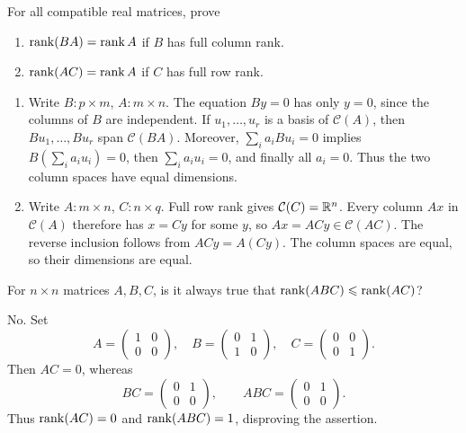 \begin{problem}\label{ex:04:full-rank-products}
For all compatible real matrices, prove
\begin{enumerate}
\item \(\operatorname{rank}(BA)=\operatorname{rank} A\) if \(B\) has full column rank.
\item \(\operatorname{rank}(AC)=\operatorname{rank} A\) if \(C\) has full row rank.
\end{enumerate}
\end{problem}
\begin{solution}
\begin{enumerate}
\item Write \(B:p\times m\), \(A:m\times n\).
The equation \(By=0\) has only \(y=0\), since the columns of \(B\) are independent.
If \(u_1,\ldots,u_r\) is a basis of \(\mathcal C(A)\), then
\(Bu_1,\ldots,Bu_r\) span \(\mathcal C(BA)\).
Moreover, \(\sum_i a_iBu_i=0\) implies \(B(\sum_i a_iu_i)=0\),
then \(\sum_i a_iu_i=0\), and finally all \(a_i=0\).
Thus the two column spaces have equal dimensions.
\item Write \(A:m\times n\), \(C:n\times q\).
Full row rank gives \(\mathcal C(C)=\mathbb R^n\).
Every column \(Ax\) in \(\mathcal C(A)\) therefore has
\(x=Cy\) for some \(y\), so \(Ax=ACy\in\mathcal C(AC)\).
The reverse inclusion follows from \(ACy=A(Cy)\).
The column spaces are equal, so their dimensions are equal.
\end{enumerate}
\end{solution}

\begin{problem}\label{ex:04:middle-factor}
For \(n\times n\) matrices \(A,B,C\), is it always true that
\(\operatorname{rank}(ABC)\leqslant\operatorname{rank}(AC)\)?
\end{problem}
\begin{solution}
No. Set
\[
A=\begin{pmatrix}1&0\\0&0\end{pmatrix},\quad
B=\begin{pmatrix}0&1\\1&0\end{pmatrix},\quad
C=\begin{pmatrix}0&0\\0&1\end{pmatrix}.
\]
Then \(AC=0\), whereas
\[
BC=\begin{pmatrix}0&1\\0&0\end{pmatrix},\qquad
ABC=\begin{pmatrix}0&1\\0&0\end{pmatrix}.
\]
Thus \(\operatorname{rank}(AC)=0\) and \(\operatorname{rank}(ABC)=1\), disproving the assertion.
\end{solution}

